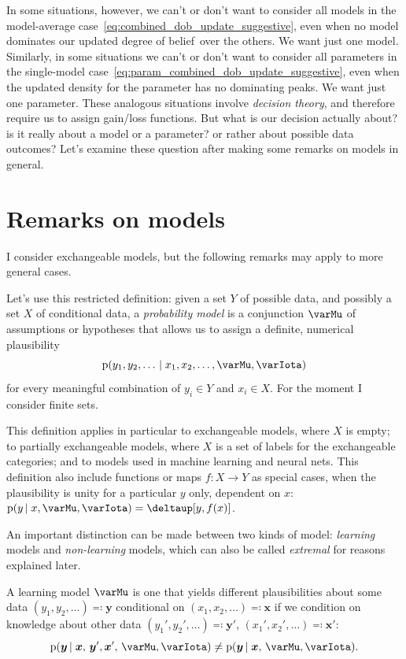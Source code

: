 \documentclass[\ifafour a4paper,12pt,\else a5paper,10pt,\fi%
onecolumn,oneside,article,%
british%
]{memoir}
\theoremstyle{remark}
\theoremstyle{innote}
\newcommand*{\delt}{\deltaup}%
\newcommand*{\defs}{\eqqcolon}
\newcommand*{\pf}{\mathrm{p}}%
\renewcommand*{\|}{\nonscript\,\vert\nonscript\;\mathopen{}}
\newcommand*{\dob}{degree of belief}
\newcommand*{\yM}{\varMu}
\newcommand*{\yX}{X}
\newcommand*{\yY}{Y}
\newcommand*{\yx}{\bm{x}}
\newcommand*{\yy}{\bm{y}}
\newcommand*{\yI}{\varIota}
\begin{document}
\medskip

In some situations, however, we can't or don't want to consider all models
in the model-average case~\eqref{eq:combined_dob_update_suggestive}, even
when no model dominates our updated \dob\ over the others. We want just one
model. Similarly, in some situations we can't or don't want to consider all
parameters in the single-model
case~\eqref{eq:param_combined_dob_update_suggestive}, even when the updated
density for the parameter has no dominating peaks. We want just one
parameter. These analogous situations involve \emph{decision theory}, and
therefore require us to assign gain/loss functions. But what is our
decision actually about? is it really about a model or a parameter? or
rather about possible data outcomes? Let's examine these question after
making some remarks on models in general.


\section{Remarks on models}
\label{sec:tentative_def}

I consider exchangeable models, but the following remarks may apply to more
general cases.

Let's use this restricted definition: given a set $\yY$ of possible data,
and possibly a set $\yX$ of conditional data, a \emph{probability model} is
a conjunction $\yM$ of assumptions or hypotheses that allows us to assign a
definite, numerical plausibility
\begin{equation}
  \pf(y_1, y_2,\dotsc \| x_1, x_2, \dotsc, \yM, \yI)
  \label{eq:plaus}
\end{equation}
for every meaningful combination of $y_i \in \yY$ and $x_i \in \yX$. For
the moment I consider finite sets.

This definition applies in particular to exchangeable models, where $\yX$
is empty; to partially exchangeable models, where $\yX$ is a set of labels
for the exchangeable categories; and to models used in machine learning and
neural nets. This definition also include functions or maps
$f \colon \yX \to \yY$ as special cases, when the plausibility is unity for
a particular $y$ only, dependent on $x$:
$\pf(y \| x, \yM, \yI) = \delt[y, f(x)]$.

An important distinction can be made between two kinds of model:
\emph{learning} models and \emph{non-learning} models, which can also be
called \emph{extremal} for reasons explained later.

A learning model $\yM$ is one that yields different plausibilities about
some data $(y_1, y_2, \dotsc) \defs \yy$ conditional on
$(x_1, x_2, \dotsc) \defs \yx$ if we condition on knowledge about other
data $(y_1', y_2', \dotsc) \defs \yy'$, $(x_1', x_2', \dotsc) \defs \yx'$:
\begin{equation}
  \label{eq:learning_def}
  \pf(\yy  \| \yx,\, \yy', \yx',\, \yM, \yI) \ne
  \pf(\yy  \| \yx,\, \yM, \yI).
\end{equation}
\end{document}
